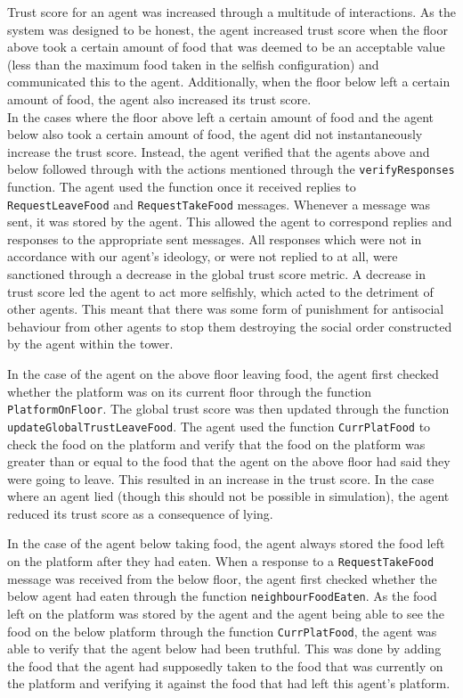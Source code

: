 Trust score for an agent was increased through a multitude of interactions. As the system was designed to be honest, the agent increased trust score when the floor above took a certain amount of food that was deemed to be an acceptable value (less than the maximum food taken in the selfish configuration) and communicated this to the agent. Additionally, when the floor below left a certain amount of food, the agent also increased its trust score.\\

In the cases where the floor above left a certain amount of food and the agent below also took a certain amount of food, the agent did not instantaneously increase the trust score. Instead, the agent verified that the agents above and below followed through with the actions mentioned through the \texttt{verifyResponses} function. The agent used the function once it received replies to \texttt{RequestLeaveFood} and \texttt{RequestTakeFood} messages. Whenever a message was sent, it was stored by the agent. This allowed the agent to correspond replies and responses to the appropriate sent messages. All responses which were not in accordance with our agent's ideology, or were not replied to at all, were sanctioned through a decrease in the global trust score metric. A decrease in trust score led the agent to act more selfishly, which acted to the detriment of other agents. This meant that there was some form of punishment for antisocial behaviour from other agents to stop them destroying the social order constructed by the agent within the tower.

In the case of the agent on the above floor leaving food, the agent first checked whether the platform was on its current floor through the function \texttt{PlatformOnFloor}. The global trust score was then updated through the function \texttt{updateGlobalTrustLeaveFood}. The agent used the function \texttt{CurrPlatFood} to check the food on the platform and verify that the food on the platform was greater than or equal to the food that the agent on the above floor had said they were going to leave. This resulted in an increase in the trust score. In the case where an agent lied (though this should not be possible in simulation), the agent reduced its trust score as a consequence of lying. 

In the case of the agent below taking food, the agent always stored the food left on the platform after they had eaten. When a response to a \texttt{RequestTakeFood} message was received from the below floor, the agent first checked whether the below agent had eaten through the function \texttt{neighbourFoodEaten}. As the food left on the platform was stored by the agent and the agent being able to see the food on the below platform through the function \texttt{CurrPlatFood}, the agent was able to verify that the agent below had been truthful. This was done by adding the food that the agent had supposedly taken to the food that was currently on the platform and verifying it against the food that had left this agent's platform.

